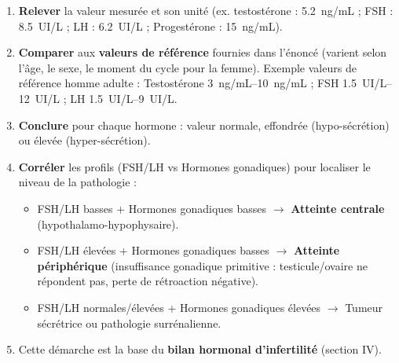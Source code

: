 \documentclass[11pt]{article}
\begin{document}
\begin{methode}
\begin{enumerate}
\item \textbf{Relever} la valeur mesurée et son unité (ex. testostérone : \SI{5,2}{ng/mL} ; FSH : \SI{8,5}{UI/L} ; LH : \SI{6,2}{UI/L} ; Progestérone : \SI{15}{ng/mL}).
\item \textbf{Comparer} aux \textbf{valeurs de référence} fournies dans l'énoncé (varient selon l'âge, le sexe, le moment du cycle pour la femme). Exemple valeurs de référence homme adulte : Testostérone \SIrange{3}{10}{ng/mL} ; FSH \SIrange{1,5}{12}{UI/L} ; LH \SIrange{1,5}{9}{UI/L}.
\item \textbf{Conclure} pour chaque hormone : valeur normale, effondrée (hypo-sécrétion) ou élevée (hyper-sécrétion).
\item \textbf{Corréler} les profils (FSH/LH vs Hormones gonadiques) pour localiser le niveau de la pathologie :
\begin{itemize}
\item FSH/LH basses + Hormones gonadiques basses $\rightarrow$ \textbf{Atteinte centrale} (hypothalamo-hypophysaire).
\item FSH/LH élevées + Hormones gonadiques basses $\rightarrow$ \textbf{Atteinte périphérique} (insuffisance gonadique primitive : testicule/ovaire ne répondent pas, perte de rétroaction négative).
\item FSH/LH normales/élevées + Hormones gonadiques élevées $\rightarrow$ Tumeur sécrétrice ou pathologie surrénalienne.
\end{itemize}
\item Cette démarche est la base du \textbf{bilan hormonal d'infertilité} (section IV).
\end{enumerate}
\end{methode}
\end{document}
